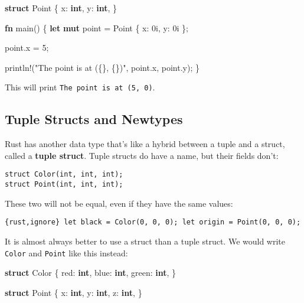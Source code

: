 \documentclass[]{article}
\newenvironment{Shaded}{}{}
\newcommand{\KeywordTok}[1]{\textcolor[rgb]{0.00,0.44,0.13}{\textbf{{#1}}}}
\newcommand{\DecValTok}[1]{\textcolor[rgb]{0.25,0.63,0.44}{{#1}}}
\newcommand{\StringTok}[1]{\textcolor[rgb]{0.25,0.44,0.63}{{#1}}}
\newcommand{\OtherTok}[1]{\textcolor[rgb]{0.00,0.44,0.13}{{#1}}}
\newcommand{\NormalTok}[1]{{#1}}
\begin{document}
\begin{Shaded}
\begin{Highlighting}[]
\KeywordTok{struct} \NormalTok{Point \{}
    \NormalTok{x: }\KeywordTok{int}\NormalTok{,}
    \NormalTok{y: }\KeywordTok{int}\NormalTok{,}
\NormalTok{\}}

\KeywordTok{fn} \NormalTok{main() \{}
    \KeywordTok{let} \KeywordTok{mut} \NormalTok{point = Point \{ x: }\DecValTok{0i}\NormalTok{, y:  }\DecValTok{0i} \NormalTok{\};}

    \NormalTok{point.x = }\DecValTok{5}\NormalTok{;}

    \OtherTok{println!}\NormalTok{(}\StringTok{"The point is at (\{\}, \{\})"}\NormalTok{, point.x, point.y);}
\NormalTok{\}}
\end{Highlighting}
\end{Shaded}

This will print \texttt{The point is at (5, 0)}.

\subsection{Tuple Structs and
Newtypes}\label{tuple-structs-and-newtypes}

Rust has another data type that's like a hybrid between a tuple and a
struct, called a \textbf{tuple struct}. Tuple structs do have a name,
but their fields don't:

\begin{verbatim}
struct Color(int, int, int);
struct Point(int, int, int);
\end{verbatim}

These two will not be equal, even if they have the same values:

\texttt{\{rust,ignore\} let black  = Color(0, 0, 0); let origin = Point(0, 0, 0);}

It is almost always better to use a struct than a tuple struct. We would
write \texttt{Color} and \texttt{Point} like this instead:

\begin{Shaded}
\begin{Highlighting}[]
\KeywordTok{struct} \NormalTok{Color \{}
    \NormalTok{red: }\KeywordTok{int}\NormalTok{,}
    \NormalTok{blue: }\KeywordTok{int}\NormalTok{,}
    \NormalTok{green: }\KeywordTok{int}\NormalTok{,}
\NormalTok{\}}

\KeywordTok{struct} \NormalTok{Point \{}
    \NormalTok{x: }\KeywordTok{int}\NormalTok{,}
    \NormalTok{y: }\KeywordTok{int}\NormalTok{,}
    \NormalTok{z: }\KeywordTok{int}\NormalTok{,}
\NormalTok{\}}
\end{Highlighting}
\end{Shaded}
\end{document}
